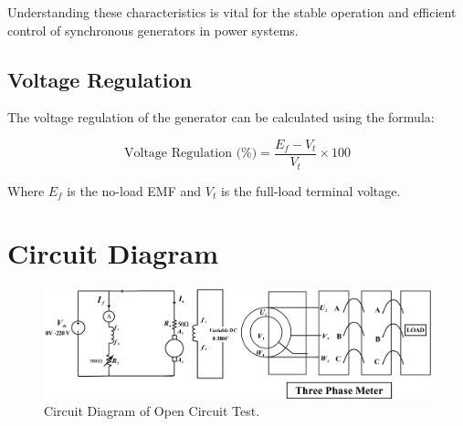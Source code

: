 \documentclass[a4paper,12pt]{article}
\begin{document}
Understanding these characteristics is vital for the stable operation and efficient control of synchronous generators in power systems.

\subsection{Voltage Regulation}

The voltage regulation of the generator can be calculated using the formula:

\[
\text{Voltage Regulation (\%)} = \frac{E_f - V_t}{V_t} \times 100
\]

Where \( E_f \) is the no-load EMF and \( V_t \) is the full-load terminal voltage.


	
	\newpage
	\section{Circuit Diagram}
	\begin{figure}[H]
		\centering
		
			\centering
			\includegraphics[width=1\textwidth]{Images/6}
			\caption{Circuit Diagram of Open Circuit Test.}
			
	
		
	\end{figure}
	
\end{document}
